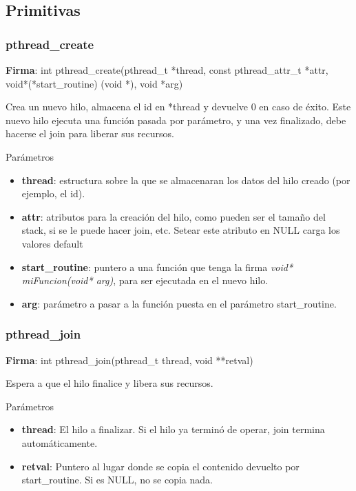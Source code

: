 \documentclass[a4paper, twoside]{article}
\begin{document}
\subsection{Primitivas}
\subsubsection{pthread\_create}
\textbf{Firma}: int pthread\_create(pthread\_t *thread, const pthread\_attr\_t *attr, void*(*start\_routine) (void *), void *arg)\par
Crea un nuevo hilo, almacena el id en *thread y devuelve 0 en caso de éxito. Este nuevo hilo ejecuta una función pasada por parámetro, y una vez finalizado, debe hacerse el join para liberar sus recursos.

\begin{parametros*}{Parámetros}
	\begin{itemize}
		\item \textbf{thread}: estructura sobre la que se almacenaran los datos del hilo creado (por ejemplo, el id).
		\item \textbf{attr}: atributos para la creación del hilo, como pueden ser el tamaño del stack, si se le puede hacer join, etc. Setear este atributo en NULL carga los valores default
		\item \textbf{start\_routine}: puntero a una función que tenga la firma \emph{void* miFuncion(void* arg)}, para ser ejecutada en el nuevo hilo.
		\item \textbf{arg}: parámetro a pasar a la función puesta en el parámetro start\_routine. 
	\end{itemize}
\end{parametros*}

\subsubsection{pthread\_join}
\textbf{Firma}: int pthread\_join(pthread\_t thread, void **retval)\par
Espera a que el hilo finalice y libera sus recursos.

\begin{parametros*}{Parámetros}
	\begin{itemize}
		\item \textbf{thread}: El hilo a finalizar. Si el hilo ya terminó de operar, join termina automáticamente.
		\item \textbf{retval}: Puntero al lugar donde se copia el contenido devuelto por start\_routine. Si es NULL, no se copia nada.
	\end{itemize}
\end{parametros*}
\end{document}
